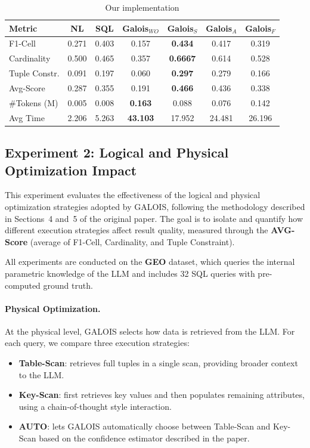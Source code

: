 \begin{table}[H]
\centering
\begin{tabular}{lcccccc}
\hline
\textbf{Metric} & \textbf{NL} & \textbf{SQL} & \textbf{Galois$_{WO}$} & \textbf{Galois$_S$} & \textbf{Galois$_A$} & \textbf{Galois$_F$} \\
\hline
F1-Cell        & 0.271 & 0.403 & 0.157 & \textbf{0.434} & 0.417 & 0.319 \\
Cardinality    & 0.500 & 0.465 & 0.357 & \textbf{0.6667} & 0.614 & 0.528 \\
Tuple Constr.  & 0.091 & 0.197 & 0.060 & \textbf{0.297} & 0.279 & 0.166 \\
Avg-Score      & 0.287 & 0.355 & 0.191 & \textbf{0.466} & 0.436 & 0.338 \\
\#Tokens (M)   & 0.005 & 0.008 & \textbf{0.163} & 0.088 & 0.076 & 0.142 \\
Avg Time       & 2.206   & 5.263  & \textbf{43.103}  & 17.952  & 24.481 & 26.196 \\
\hline
\end{tabular}
\caption{Our implementation}
\label{tab:galois_comparison}
\end{table}


\subsection{Experiment 2: Logical and Physical Optimization Impact}

This experiment evaluates the effectiveness of the logical and physical optimization strategies adopted by \textsc{GALOIS}, following the methodology described in Sections~4 and~5 of the original paper. 
The goal is to isolate and quantify how different execution strategies affect result quality, measured through the \textbf{AVG-Score} (average of F1-Cell, Cardinality, and Tuple Constraint).

\vspace{0.5em}
\noindent
All experiments are conducted on the \textbf{GEO} dataset, which queries the internal parametric knowledge of the LLM and includes 32 SQL queries with pre-computed ground truth.

\paragraph{Physical Optimization.}
At the physical level, \textsc{GALOIS} selects how data is retrieved from the LLM. 
For each query, we compare three execution strategies:
\begin{itemize}
    \item \textbf{Table-Scan}: retrieves full tuples in a single scan, providing broader context to the LLM.
    \item \textbf{Key-Scan}: first retrieves key values and then populates remaining attributes, using a chain-of-thought style interaction.
    \item \textbf{AUTO}: lets \textsc{GALOIS} automatically choose between Table-Scan and Key-Scan based on the confidence estimator described in the paper.
\end{itemize}

